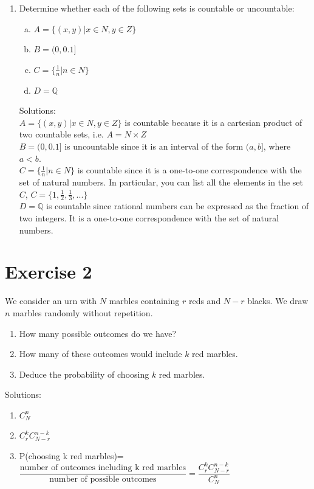 \documentclass[12pt,thmsa]{article}\usepackage[]{graphicx}\usepackage[]{color}
\begin{document}
\begin{enumerate}
\item Determine whether each of the following sets is countable or uncountable:
\begin{enumerate}[a)]
\item $ A=\{(x,y)|x \in N, y \in Z\} $
\item $ B=(0, 0.1] $
\item $ C=\{\frac{1}{n}|n \in N\} $
\item $ D=\mathbb{Q} $
\end{enumerate}

Solutions:\\
$ A=\{(x,y)|x \in N, y \in Z\} $ is countable because it is a cartesian product of two countable sets, i.e. $ A=N \times Z $\\
$ B=(0, 0.1] $ is uncountable since it is an interval of the form $ (a,b] $, where $ a < b $.\\
$ C=\{\frac{1}{n}|n \in N\} $ is countable since it is a one-to-one correspondence with the set of natural numbers. In particular, you can list all the elements in the set $C$, $ C=\{1, \frac{1}{2}, \frac{1}{3}, ...\} $\\
$ D=\mathbb{Q} $  is countable since rational numbers can be expressed as the fraction of two integers.  It is a one-to-one correspondence with the set of natural numbers.




\end{enumerate}

\section*{Exercise 2}


We consider an urn with $N$ marbles containing $r$ reds and $N-r$ blacks. We draw $n$ marbles randomly without repetition.
\begin{enumerate}
  \item How many possible outcomes do we have?
  \item How many of these outcomes would include $k$ red marbles.
  \item Deduce the probability of choosing $k$ red marbles.
\end{enumerate}

Solutions:
\begin{enumerate}
\item $C^{n}_{N}$
\item $C^{k}_{r} C^{n-k}_{N-r}$
\item P(choosing k red marbles)=$\dfrac{\text{number of outcomes including k red marbles}}{\text{number of possible outcomes}}=\dfrac{C^{k}_{r} C^{n-k}_{N-r}}{C^{n}_{N}}$
\end{enumerate}
\end{document}
